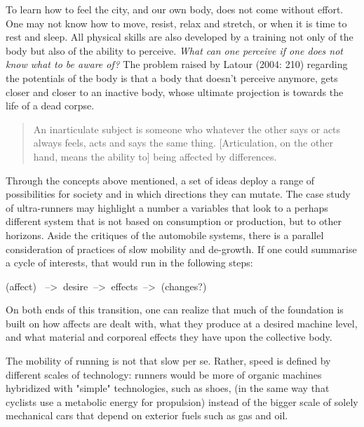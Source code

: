 To learn how to feel the city, and our own body, does not come without effort. One may not know how to move, resist, relax and stretch, or when it is time to rest and sleep. All physical skills are also developed by a training not only of the body but also of the ability to perceive. \textit{What can one perceive if one does not know what to be aware of?} The problem raised by Latour (2004: 210) regarding the potentials of the body is that a body that doesn't perceive anymore, gets closer and closer to an inactive body, whose ultimate projection is towards the life of a dead corpse.

\begin{quote}
 An inarticulate subject is someone who whatever the other says or acts always feels, acts and says the same thing. [Articulation, on the other hand, means the ability to] being affected by differences.
\end{quote}

Through the concepts above mentioned, a set of ideas deploy a range of possibilities for society and in which directions they can mutate. The case study of ultra-runners may highlight a number a variables that look to a perhaps different system that is not based on consumption or production, but  to other horizons. Aside the critiques of the automobile systems, there is a parallel consideration of practices of slow mobility and de-growth. If one could summarise a cycle of interests, that would run in the following steps:


\begin{center}
 (affect) $ \> $ --> $ \> $desire $ \> $--> $ \> $effects $ \> $--> $ \> $(changes?)
\end{center}

On both ends of this transition, one can realize that much of the foundation is built on how affects are dealt with, what they produce at a desired machine level, and what material and corporeal effects they have upon the collective body.

The mobility of running is not that slow per se. Rather, speed is defined by different scales of technology: runners would be more of organic machines hybridized with "simple" technologies, such as shoes, (in the same way that cyclists use a metabolic energy for propulsion) instead of the bigger scale of solely mechanical cars that depend on exterior fuels such as gas and oil.

